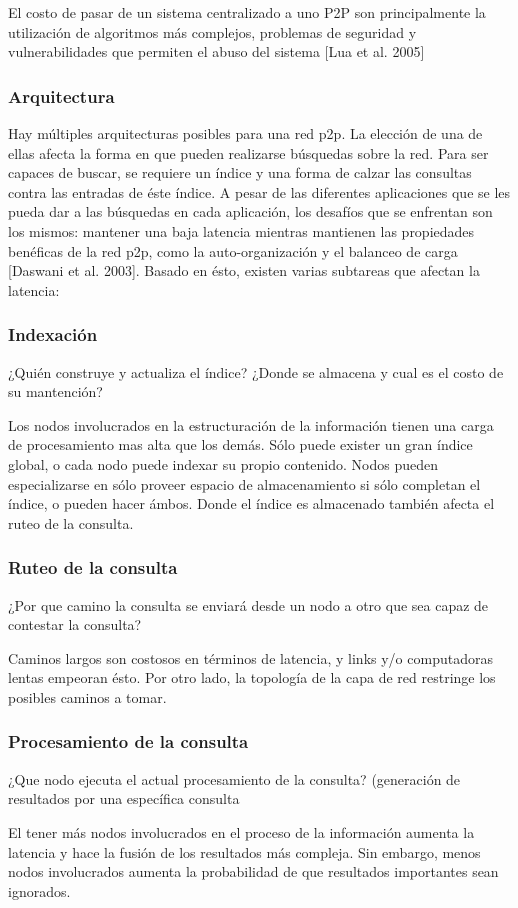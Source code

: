 El costo de pasar de un sistema centralizado a uno P2P son principalmente la
utilización de algoritmos más complejos, problemas de seguridad y
vulnerabilidades que permiten el abuso del sistema [Lua et al. 2005]


\subsubsection{Arquitectura}

Hay múltiples arquitecturas posibles para una red p2p. La elección de una de
ellas afecta la forma en que pueden realizarse búsquedas sobre la red. Para ser
capaces de buscar, se requiere un índice y una forma de calzar las consultas
contra las entradas de éste índice. A pesar de las diferentes aplicaciones que
se les pueda dar a las búsquedas en cada aplicación, los desafíos que se
enfrentan son los mismos: mantener una baja latencia mientras  mantienen las
propiedades benéficas de la red p2p, como la auto-organización y el balanceo de
carga [Daswani et al. 2003].
Basado en ésto, existen varias subtareas que afectan la latencia:

\subsubsection{Indexación}
  ¿Quién construye y actualiza el índice?
  ¿Donde se almacena y cual es el costo de su mantención?

  Los nodos involucrados en la estructuración de la información tienen una
carga de procesamiento mas alta que los demás. Sólo puede exister un gran
índice global, o cada nodo puede indexar su propio contenido.
Nodos pueden especializarse en sólo proveer espacio de almacenamiento si sólo
completan el índice, o pueden hacer ámbos. Donde el índice es almacenado
también afecta el ruteo de la consulta.


\subsubsection{Ruteo de la consulta}
  ¿Por que camino la consulta se enviará desde un nodo a otro que sea capaz de
  contestar la consulta?

  Caminos largos son costosos  en términos de latencia, y links y/o
computadoras lentas empeoran ésto. Por otro lado, la topología de la capa de red restringe los
posibles caminos a tomar.


\subsubsection{Procesamiento de la consulta}
  ¿Que nodo ejecuta el actual procesamiento de la consulta? 
    (generación de resultados por una específica consulta

  El tener más nodos involucrados en el proceso de la información aumenta la
latencia y hace la fusión de los resultados más compleja. Sin embargo, menos
  nodos involucrados aumenta la probabilidad de que resultados importantes sean ignorados.
